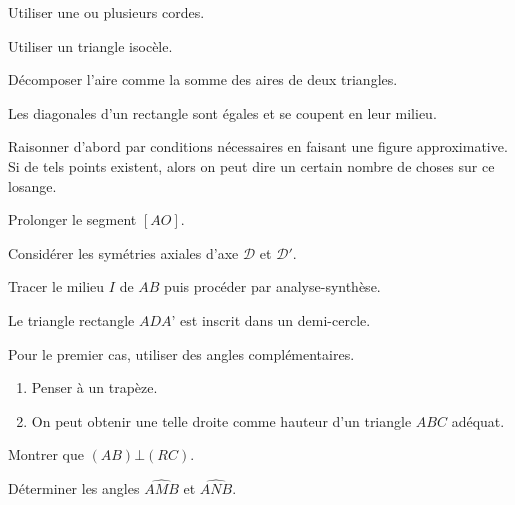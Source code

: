 \begin{Hint}{12}
Utiliser une ou plusieurs cordes.
\end{Hint}
\begin{Hint}{18}
Utiliser un triangle isocèle.
\end{Hint}
\begin{Hint}{19}
Décomposer l'aire comme la somme des aires de deux triangles.
\end{Hint}
\begin{Hint}{25}
Les diagonales d'un rectangle sont égales et se coupent en leur milieu. %
\end{Hint}
\begin{Hint}{27}
Raisonner d'abord par conditions nécessaires en faisant une figure approximative. Si de tels points existent, alors on peut dire un certain nombre de choses sur ce losange.
\end{Hint}
\begin{Hint}{29}
Prolonger le segment $[AO]$.
\end{Hint}
\begin{Hint}{32}
Considérer les symétries axiales d'axe $\mathcal D$ et $\mathcal D'$.
\end{Hint}
\begin{Hint}{36}
   Tracer le milieu $I$ de $AB$ puis procéder par analyse-synthèse.
\end{Hint}
\begin{Hint}{38}
Le triangle rectangle $ADA’$ est inscrit dans un demi-cercle.
\end{Hint}
\begin{Hint}{39}
Pour le premier cas, utiliser des angles complémentaires.
\end{Hint}
\begin{Hint}{40}
\end{Hint}
\begin{Hint}{41}
\begin{enumerate}
\item Penser à un trapèze.
\item On peut obtenir une telle droite comme hauteur d'un triangle $ABC$ adéquat.
\end{enumerate}
\end{Hint}
\begin{Hint}{42}
Montrer que $(AB) \bot (RC)$.
\end{Hint}
\begin{Hint}{43}
Déterminer les angles $\widehat{AMB}$ et $\widehat{ANB}$.
\end{Hint}
